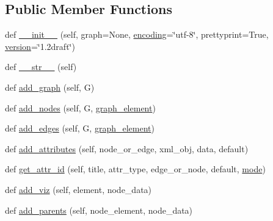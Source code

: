 \subsection*{Public Member Functions}
\begin{DoxyCompactItemize}
\item 
def \hyperlink{classnetworkx_1_1readwrite_1_1gexf_1_1GEXFWriter_a6e9a3a72bb01f2818b096bd3a4e9945e}{\+\_\+\+\_\+init\+\_\+\+\_\+} (self, graph=None, \hyperlink{classnetworkx_1_1readwrite_1_1gexf_1_1GEXFWriter_a8e076ff772402646ac42b1d8929e96ed}{encoding}=\char`\"{}utf-\/8\char`\"{}, prettyprint=True, \hyperlink{classnetworkx_1_1readwrite_1_1gexf_1_1GEXF_a3226aabb6dd2080faef052bca59a7a4d}{version}=\char`\"{}1.\+2draft\char`\"{})
\item 
def \hyperlink{classnetworkx_1_1readwrite_1_1gexf_1_1GEXFWriter_aa70f4a9d8493a2a9bb718185dd4a210b}{\+\_\+\+\_\+str\+\_\+\+\_\+} (self)
\item 
def \hyperlink{classnetworkx_1_1readwrite_1_1gexf_1_1GEXFWriter_aa5905121f11141a498c8b9bd2e468b34}{add\+\_\+graph} (self, G)
\item 
def \hyperlink{classnetworkx_1_1readwrite_1_1gexf_1_1GEXFWriter_a3bc86e56bfda232690bf88e5fb5c60a8}{add\+\_\+nodes} (self, G, \hyperlink{classnetworkx_1_1readwrite_1_1gexf_1_1GEXFWriter_afd6ba8266c6d0bf42a86f14d2a5db516}{graph\+\_\+element})
\item 
def \hyperlink{classnetworkx_1_1readwrite_1_1gexf_1_1GEXFWriter_ac8632d6760d9f641a0c82fd1525aa7b2}{add\+\_\+edges} (self, G, \hyperlink{classnetworkx_1_1readwrite_1_1gexf_1_1GEXFWriter_afd6ba8266c6d0bf42a86f14d2a5db516}{graph\+\_\+element})
\item 
def \hyperlink{classnetworkx_1_1readwrite_1_1gexf_1_1GEXFWriter_a9022d19620f852541bdec63d0763cde6}{add\+\_\+attributes} (self, node\+\_\+or\+\_\+edge, xml\+\_\+obj, data, default)
\item 
def \hyperlink{classnetworkx_1_1readwrite_1_1gexf_1_1GEXFWriter_a2d118a4f53c8d57703c1b9aec8e90d61}{get\+\_\+attr\+\_\+id} (self, title, attr\+\_\+type, edge\+\_\+or\+\_\+node, default, \hyperlink{namespacenetworkx_1_1readwrite_1_1gexf_ac603c971d93c75cffd74249147f7b532}{mode})
\item 
def \hyperlink{classnetworkx_1_1readwrite_1_1gexf_1_1GEXFWriter_a6b651f3ff60a0ceb381d301a9e2c6040}{add\+\_\+viz} (self, element, node\+\_\+data)
\item 
def \hyperlink{classnetworkx_1_1readwrite_1_1gexf_1_1GEXFWriter_aaffbf472c886d603835618b94c3257b9}{add\+\_\+parents} (self, node\+\_\+element, node\+\_\+data)

\end{DoxyCompactItemize}
